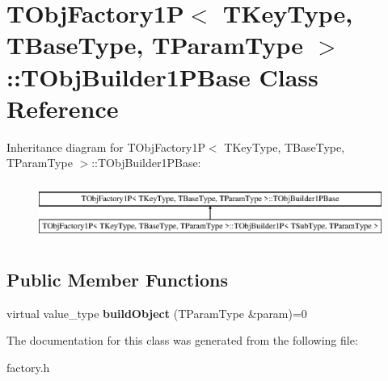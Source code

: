 \hypertarget{class_t_obj_factory1_p_1_1_t_obj_builder1_p_base}{\section{T\+Obj\+Factory1\+P$<$ T\+Key\+Type, T\+Base\+Type, T\+Param\+Type $>$\+:\+:T\+Obj\+Builder1\+P\+Base Class Reference}
\label{class_t_obj_factory1_p_1_1_t_obj_builder1_p_base}
}
Inheritance diagram for T\+Obj\+Factory1\+P$<$ T\+Key\+Type, T\+Base\+Type, T\+Param\+Type $>$\+:\+:T\+Obj\+Builder1\+P\+Base\+:\begin{figure}[H]
\begin{center}
\leavevmode
\includegraphics[height=1.904762cm]{class_t_obj_factory1_p_1_1_t_obj_builder1_p_base}
\end{center}
\end{figure}
\subsection*{Public Member Functions}
\begin{DoxyCompactItemize}
\item 
\hypertarget{class_t_obj_factory1_p_1_1_t_obj_builder1_p_base_ad426c6f350c11d7cf2c51257e008952f}{virtual value\+\_\+type {\bfseries build\+Object} (T\+Param\+Type \&param)=0}\label{class_t_obj_factory1_p_1_1_t_obj_builder1_p_base_ad426c6f350c11d7cf2c51257e008952f}

\end{DoxyCompactItemize}


The documentation for this class was generated from the following file\+:\begin{DoxyCompactItemize}
\item 
factory.\+h\end{DoxyCompactItemize}
